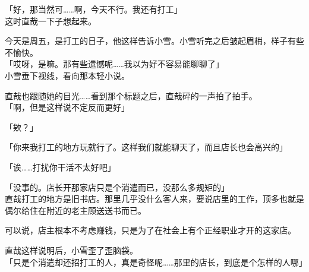 「好，那当然可……啊，今天不行。我还有打工」\\

这时直哉一下子想起来。

今天是周五，是打工的日子，他这样告诉小雪。小雪听完之后皱起眉梢，样子有些不愉快。\\

「哎呀，是嘛。那有些遗憾呢……我以为好不容易能聊聊了」\\

小雪垂下视线，看向那本轻小说。

直哉也跟随她的目光……看到那个标题之后，直哉砰的一声拍了拍手。\\

「啊，但是这样说不定反而更好」

「欸？」

「你来我打工的地方玩就行了。这样我们就能聊天了，而且店长也会高兴的」

「诶……打扰你干活不太好吧」

「没事的。店长开那家店只是个消遣而已，没那么多规矩的」\\

直哉打工的地方是旧书店。那里几乎没什么客人来，要说店里的工作，顶多也就是偶尔给住在附近的老主顾送送书而已。

可以说，店主根本不考虑赚钱，只是为了在社会上有个正经职业才开的这家店。

直哉这样说明后，小雪歪了歪脑袋。\\

「只是个消遣却还招打工的人，真是奇怪呢……那里的店长，到底是个怎样的人哪」

